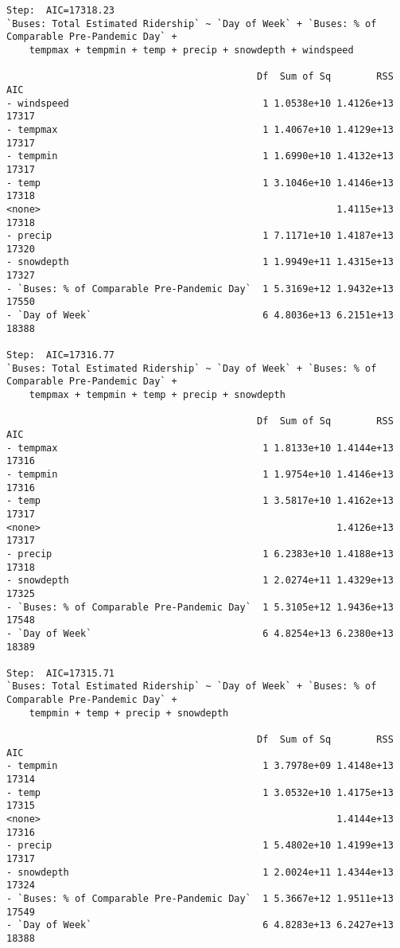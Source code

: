 \documentclass[
  letterpaper,
  DIV=11,
  numbers=noendperiod]{scrartcl}
\begin{document}
\begin{verbatim}
Step:  AIC=17318.23
`Buses: Total Estimated Ridership` ~ `Day of Week` + `Buses: % of Comparable Pre-Pandemic Day` + 
    tempmax + tempmin + temp + precip + snowdepth + windspeed

                                            Df  Sum of Sq        RSS   AIC
- windspeed                                  1 1.0538e+10 1.4126e+13 17317
- tempmax                                    1 1.4067e+10 1.4129e+13 17317
- tempmin                                    1 1.6990e+10 1.4132e+13 17317
- temp                                       1 3.1046e+10 1.4146e+13 17318
<none>                                                    1.4115e+13 17318
- precip                                     1 7.1171e+10 1.4187e+13 17320
- snowdepth                                  1 1.9949e+11 1.4315e+13 17327
- `Buses: % of Comparable Pre-Pandemic Day`  1 5.3169e+12 1.9432e+13 17550
- `Day of Week`                              6 4.8036e+13 6.2151e+13 18388

Step:  AIC=17316.77
`Buses: Total Estimated Ridership` ~ `Day of Week` + `Buses: % of Comparable Pre-Pandemic Day` + 
    tempmax + tempmin + temp + precip + snowdepth

                                            Df  Sum of Sq        RSS   AIC
- tempmax                                    1 1.8133e+10 1.4144e+13 17316
- tempmin                                    1 1.9754e+10 1.4146e+13 17316
- temp                                       1 3.5817e+10 1.4162e+13 17317
<none>                                                    1.4126e+13 17317
- precip                                     1 6.2383e+10 1.4188e+13 17318
- snowdepth                                  1 2.0274e+11 1.4329e+13 17325
- `Buses: % of Comparable Pre-Pandemic Day`  1 5.3105e+12 1.9436e+13 17548
- `Day of Week`                              6 4.8254e+13 6.2380e+13 18389

Step:  AIC=17315.71
`Buses: Total Estimated Ridership` ~ `Day of Week` + `Buses: % of Comparable Pre-Pandemic Day` + 
    tempmin + temp + precip + snowdepth

                                            Df  Sum of Sq        RSS   AIC
- tempmin                                    1 3.7978e+09 1.4148e+13 17314
- temp                                       1 3.0532e+10 1.4175e+13 17315
<none>                                                    1.4144e+13 17316
- precip                                     1 5.4802e+10 1.4199e+13 17317
- snowdepth                                  1 2.0024e+11 1.4344e+13 17324
- `Buses: % of Comparable Pre-Pandemic Day`  1 5.3667e+12 1.9511e+13 17549
- `Day of Week`                              6 4.8283e+13 6.2427e+13 18388


\end{verbatim}
\end{document}
